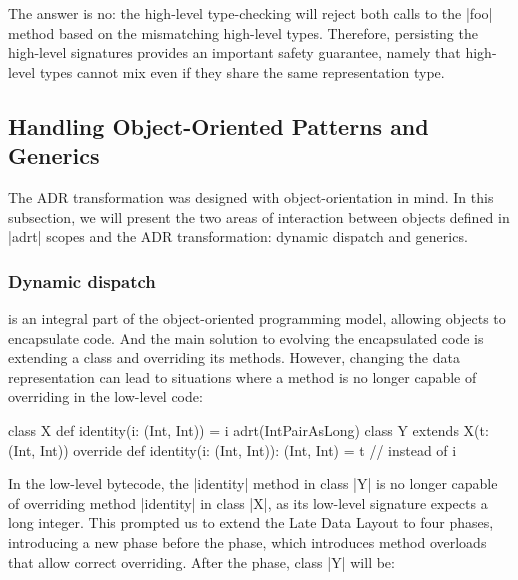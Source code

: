 The answer is no: the high-level type-checking will reject both calls to the |foo| method based on the mismatching high-level types. Therefore, persisting the high-level signatures provides an important safety guarantee, namely that high-level types cannot mix even if they share the same representation type.





\subsection{Handling Object-Oriented Patterns and Generics}
\label{sec:ildl:generics}

The ADR transformation was designed with object-orientation in mind. In this subsection, we will present the two areas of interaction between objects defined in |adrt| scopes and the ADR transformation: dynamic dispatch and generics.

\subsubsection{Dynamic dispatch }
is an integral part of the object-oriented programming model, allowing objects to encapsulate code. And the main solution to evolving the encapsulated code is extending a class and overriding its methods. However, changing the data representation can lead to situations where a method is no longer capable of overriding in the low-level code:

\begin{lstlisting-nobreak}
class X {
  def identity(i: (Int, Int)) = i
}
adrt(IntPairAsLong) {
  class Y extends X(t: (Int, Int)) {
    override def identity(i: (Int, Int)): (Int, Int) = t // instead of i
  }
}
\end{lstlisting-nobreak}

In the low-level bytecode, the |identity| method in class |Y| is no longer capable of overriding method |identity| in class |X|, as its low-level signature expects a long integer. This prompted us to extend the Late Data Layout to four phases, introducing a new \bridge{} phase before the \coerce{} phase, which introduces method overloads that allow correct overriding. After the \inject{} phase, class |Y| will be:

